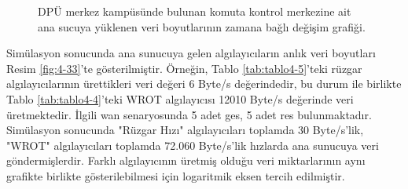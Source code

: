 \begin{figure}[htbp]
\centering



\caption{DPÜ merkez kampüsünde bulunan komuta kontrol merkezine ait ana sucuya yüklenen veri boyutlarının zamana bağlı değişim grafiği.}
\label{fig:4-32}
\end{figure}


Simülasyon sonucunda ana sunucuya gelen algılayıcıların anlık veri boyutları Resim \ref{fig:4-33}’te gösterilmiştir. Örneğin, Tablo \ref{tab:tablo4-5}’teki rüzgar algılayıcılarının ürettikleri veri değeri 6 Byte/s değerindedir, bu durum ile birlikte Tablo \ref{tab:tablo4-4}’teki WROT algılayıcısı 12010 Byte/s değerinde veri üretmektedir. İlgili \gls{wan} senaryosunda 5 adet \gls{ges}, 5 adet \gls{res} bulunmaktadır. Simülasyon sonucunda "Rüzgar Hızı" algılayıcıları toplamda 30 Byte/s'lik, "WROT" algılayıcıları toplamda 72.060 Byte/s'lik hızlarda ana sunucuya veri göndermişlerdir. Farklı algılayıcının üretmiş olduğu veri miktarlarının aynı grafikte birlikte gösterilebilmesi için logaritmik eksen tercih edilmiştir. 


